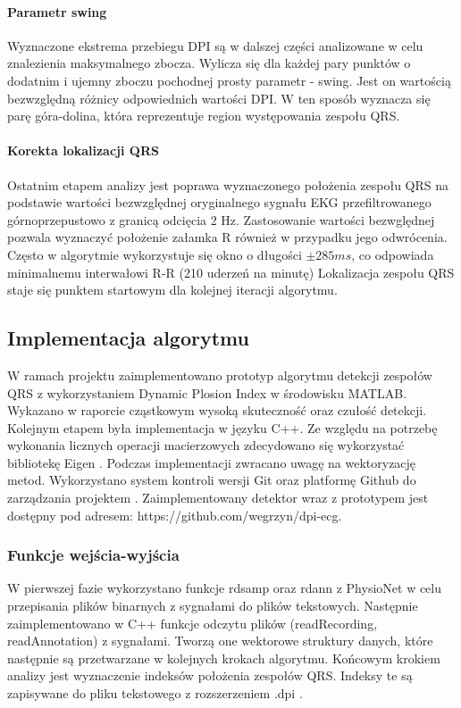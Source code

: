 \documentclass[10pt,a4paper]{article}
\begin{document}
\paragraph{Parametr swing}
Wyznaczone ekstrema przebiegu DPI są w dalszej części analizowane w celu znalezienia maksymalnego zbocza. Wylicza się dla każdej pary punktów o dodatnim i ujemny zboczu pochodnej prosty parametr - swing. Jest on wartością bezwzględną różnicy odpowiednich wartości DPI. W ten sposób wyznacza się parę góra-dolina, która reprezentuje region występowania zespołu QRS.
\paragraph{Korekta lokalizacji QRS}
Ostatnim etapem analizy jest poprawa wyznaczonego położenia zespołu QRS na podstawie wartości bezwzględnej oryginalnego sygnału EKG przefiltrowanego górnoprzepustowo z granicą odcięcia 2 Hz. Zastosowanie wartości bezwględnej pozwala wyznaczyć położenie załamka R również w przypadku jego odwrócenia. Często w algorytmie wykorzystuje się okno o długości $\pm 285ms$, co odpowiada minimalnemu interwałowi R-R (210 uderzeń na minutę) 
Lokalizacja zespołu QRS staje się punktem startowym dla kolejnej iteracji algorytmu.

\subsection{Implementacja algorytmu}
W ramach projektu zaimplementowano prototyp algorytmu detekcji zespołów QRS z wykorzystaniem Dynamic Plosion Index w środowisku MATLAB. Wykazano w raporcie cząstkowym wysoką skuteczność oraz czułość detekcji. Kolejnym etapem była implementacja w języku C++. Ze względu na potrzebę wykonania licznych operacji macierzowych zdecydowano się wykorzystać bibliotekę Eigen \cite{eigenweb}. Podczas implementacji zwracano uwagę na wektoryzację metod. Wykorzystano system kontroli wersji Git oraz platformę Github do zarządzania projektem \cite{dpi_ecg_github}. Zaimplementowany detektor wraz z prototypem jest dostępny pod adresem: https://github.com/wegrzyn/dpi-ecg.

\subsubsection{Funkcje wejścia-wyjścia}
W pierwszej fazie wykorzystano funkcje rdsamp oraz rdann z PhysioNet  w celu przepisania plików binarnych z sygnałami do plików tekstowych. Następnie zaimplementowano w C++ funkcje odczytu plików (readRecording, readAnnotation) z sygnałami. Tworzą one wektorowe struktury danych, które następnie są przetwarzane w kolejnych krokach algorytmu. Końcowym krokiem analizy jest wyznaczenie indeksów położenia zespołów QRS. Indeksy te są zapisywane do pliku tekstowego z rozszerzeniem .dpi . 
 
\end{document}
